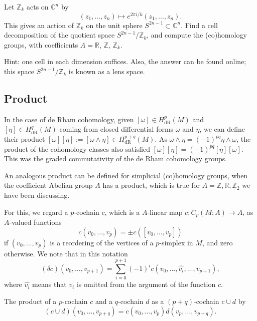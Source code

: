 \documentclass[12pt]{article}
\numberwithin{equation}{section}
\theoremstyle{remark}
\def\bC{\mathbb{C}}
\def\bR{\mathbb{R}}
\def\bZ{\mathbb{Z}}
\begin{document}
\begin{question}
Let $\bZ_k$ acts on $\bC^n$ by \begin{equation}
   (z_1,\ldots,z_n) \mapsto e^{2\pi i/k}(z_1,\ldots,z_n).
\end{equation} 
This gives an action of $\bZ_k$ on the unit sphere $S^{2n-1}\subset \bC^n$.
Find a cell decomposition of the quotient space $S^{2n-1}/\bZ_k$,
and compute the (co)homology groups, with coefficients $A=\bR$, $\bZ$, $\bZ_k$.
\end{question}
Hint: one cell in each dimension suffices. 
Also, the answer can be found online; this space $S^{2n-1}/\bZ_k$ is known as a lens space.





\subsection{Product}

In the case of de Rham cohomology, 
given $[\omega]\in H^p_\text{dR}(M)$ and $[\eta]\in H^q_\text{dR}(M)$ coming from
closed differential forms $\omega$ and $\eta$,
we can define their product $[\omega][\eta] := [\omega \wedge \eta]\in H^{p+q}_\text{dR}(M)$.
As $\omega\wedge \eta=(-1)^{pq}\eta\wedge\omega$,
the product of the cohomology classes also satisfied 
$[\omega] [\eta]=(-1)^{pq}[\eta] [\omega]$.
This was the graded commutativity of the de Rham cohomology groups.

An analogous product can be defined for simplicial (co)homology groups, when the coefficient Abelian group $A$ has a product,
 which is true for $A=\bZ,\bR,\bZ_2$ we have been discussing.

For this, we regard a  $p$-cochain $c$, which is a $A$-linear map $c:C_p(M;A)\to A$,
as $A$-valued functions \begin{equation}
c(v_0,\ldots,v_p) = \pm c([v_0,\ldots,v_p]) 
\end{equation}
if $(v_0,\ldots,v_p)$ is a reordering of the vertices of a $p$-simplex in $M$,
and zero otherwise.
We note that in this notation \begin{equation}
(\delta c)(v_0,\ldots,v_{p+1})= \sum_{i=0}^{p+1} (-1)^i c(v_0,\ldots,\widehat{v_i},\ldots,v_{p+1}),\label{eq:coboundary}
\end{equation} 
where $\widehat{v_i}$ means that $v_i$ is omitted from the argument of the function $c$.

\begin{definition}
The product of a $p$-cochain $c$ and a $q$-cochain $d$ as a $(p+q)$-cochain $c\cup d$ by \begin{equation}
(c\cup d)(v_0,\ldots,v_{p+q}) = c(v_0,\ldots,v_p) d(v_p,\ldots,v_{p+q}).
\end{equation}
\end{definition}
\end{document}
